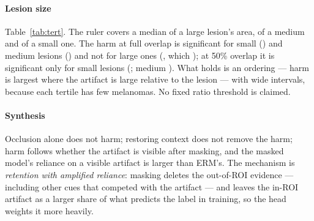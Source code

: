 \paragraph{Lesion size} Table~\ref{tab:tert}. The ruler covers a median \sTwoRatioLarge{} of a large lesion's area,
\sTwoRatioMedium{} of a medium and \sTwoRatioSmall{} of a small one. The harm at full overlap is significant for small
(\sTwoTertSmallOneZeroZero) and medium lesions (\sTwoTertMediumOneZeroZero) and not for large ones
(\sTwoTertLargeOneZeroZero, which \sTwoLargeVerdict); at 50\% overlap it is significant only for small lesions
(\sTwoTertSmallFiveZero; medium \sTwoTertMediumFiveZero). What holds is an ordering --- harm is largest where the
artifact is large relative to the lesion --- with wide intervals, because each tertile has few melanomas. No fixed ratio
threshold is claimed.


\paragraph{Synthesis} Occlusion alone does not harm; restoring context does not remove the harm; harm follows whether
the artifact is visible after masking, and the masked model's reliance on a visible artifact is larger than ERM's.
The mechanism is \emph{retention with amplified reliance}: masking deletes the out-of-ROI evidence --- including other
cues that competed with the artifact --- and leaves the in-ROI artifact as a larger share of what predicts the label in
training, so the head weights it more heavily.

